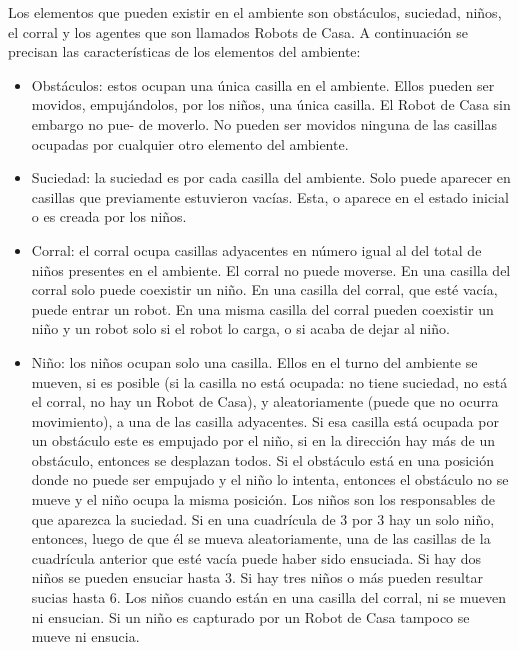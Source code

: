 \documentclass[]{article}
\begin{document}
\begin{flushleft}
	Los elementos que pueden existir en el ambiente son obstáculos, suciedad, niños, el corral y
	los agentes que son llamados Robots de Casa. A continuación se precisan las características de
	los elementos del ambiente:
\end{flushleft}

\begin{itemize}
	\item Obstáculos: estos ocupan una única casilla en el ambiente. Ellos pueden ser movidos,
	empujándolos, por los niños, una única casilla. El Robot de Casa sin embargo no pue-
	de moverlo. No pueden ser movidos ninguna de las casillas ocupadas por cualquier otro
	elemento del ambiente.

	\item Suciedad: la suciedad es por cada casilla del ambiente. Solo puede aparecer en casillas
	que previamente estuvieron vacías. Esta, o aparece en el estado inicial o es creada por los
	niños.
	
	\item Corral: el corral ocupa casillas adyacentes en número igual al del total de niños presentes
	en el ambiente. El corral no puede moverse. En una casilla del corral solo puede coexistir
	un niño. En una casilla del corral, que esté vacía, puede entrar un robot. En una misma
	casilla del corral pueden coexistir un niño y un robot solo si el robot lo carga, o si acaba
	de dejar al niño.
	
	\item Niño: los niños ocupan solo una casilla. Ellos en el turno del ambiente se mueven, si
	es posible (si la casilla no está ocupada: no tiene suciedad, no está el corral, no hay un
	Robot de Casa), y aleatoriamente (puede que no ocurra movimiento), a una de las casilla
	adyacentes. Si esa casilla está ocupada por un obstáculo este es empujado por el niño, si
	en la dirección hay más de un obstáculo, entonces se desplazan todos. Si el obstáculo está
	en una posición donde no puede ser empujado y el niño lo intenta, entonces el obstáculo
	no se mueve y el niño ocupa la misma posición.
	Los niños son los responsables de que aparezca la suciedad. Si en una cuadrícula de 3 por 3
	hay un solo niño, entonces, luego de que él se mueva aleatoriamente, una de las casillas
	de la cuadrícula anterior que esté vacía puede haber sido ensuciada. Si hay dos niños se
	pueden ensuciar hasta 3. Si hay tres niños o más pueden resultar sucias hasta 6.
	Los niños cuando están en una casilla del corral, ni se mueven ni ensucian.
	Si un niño es capturado por un Robot de Casa tampoco se mueve ni ensucia.
	

\end{itemize}
\end{document}
